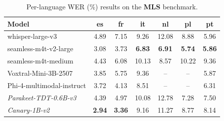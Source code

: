 \begin{landscape}
\begin{table}[ht]
\centering
\setlength{\abovecaptionskip}{10pt} %
\begin{tabular}{l*{6}{c}}
\toprule
\textbf{Model} & \textbf{es} & \textbf{fr} & \textbf{it} & \textbf{nl} & \textbf{pl} & \textbf{pt} \\
\midrule
whisper-large-v3      & 4.89 & 7.15 & 9.26 & 12.08 & 8.88 & 5.96 \\
seamless-m4t-v2-large & 3.08 & 3.73 & \textbf{6.83} & \textbf{6.91} & \textbf{5.74} & \textbf{5.86} \\
seamless-m4t-medium          & 4.43 & 6.08 & 10.13 & 8.57 & 10.22 & 9.36 \\
Voxtral-Mini-3B-2507  & 3.85 & 5.75 & 9.36 & -- & -- & 5.87 \\
Phi-4-multimodal-instruct    & 3.72 & 4.13 & 8.51 & -- & -- & 6.31 \\
\midrule
\emph{Parakeet-TDT-0.6B-v3}          & 4.39 & 4.97 & 10.08 & 12.78 & 7.28 & 7.50 \\
\midrule
\emph{Canary-1B-v2}          & \textbf{2.94} & \textbf{3.36} & 9.16 & 11.27 & 8.77 & 8.14 \\
\bottomrule
\end{tabular}
\caption{Per-language WER (\%) results on the \textbf{MLS} benchmark.}
\label{tab:mls-results}
\end{table}



\end{landscape}
